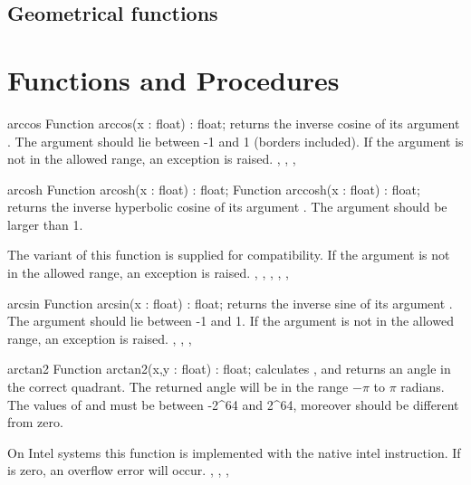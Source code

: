 \subsection{Geometrical functions}
\begin{funclist}
\end{funclist}

\section{Functions and Procedures}

\begin{function}{arccos}
\Declaration
Function arccos(x : float) : float;
\Description
{} returns the inverse cosine of its argument . The
argument  should lie between -1 and 1 (borders included). 
\Errors
If the argument  is not in the allowed range, an
 exception is raised.
\SeeAlso
{}, , , 
\end{function}


\begin{function}{arcosh}
\Declaration
Function arcosh(x : float) : float;
Function arccosh(x : float) : float;
\Description
{} returns the inverse hyperbolic cosine of its argument . 
The argument  should be larger than 1. 

The  variant of this function is supplied for \delphi 
compatibility.
\Errors
If the argument  is not in the allowed range, an 
exception is raised.
\SeeAlso
{}, , , , ,
\end{function}


\begin{function}{arcsin}
\Declaration
Function arcsin(x : float) : float;
\Description
{} returns the inverse sine of its argument . The
argument  should lie between -1 and 1. 
\Errors
If the argument  is not in the allowed range, an 
exception is raised.
\SeeAlso
{}, , , 
\end{function}



\begin{function}{arctan2}
\Declaration
Function arctan2(x,y : float) : float;
\Description
{} calculates , and returns an angle in the
correct quadrant. The returned angle will be in the range $-\pi$ to
$\pi$ radians.
The values of  and  must be between -2\^{}64 and 2\^{}64,
moreover  should be different from zero.

On Intel systems this function is implemented with the native intel
 instruction.
\Errors
If  is zero, an overflow error will occur.
\SeeAlso
{}, , , 
\end{function}


